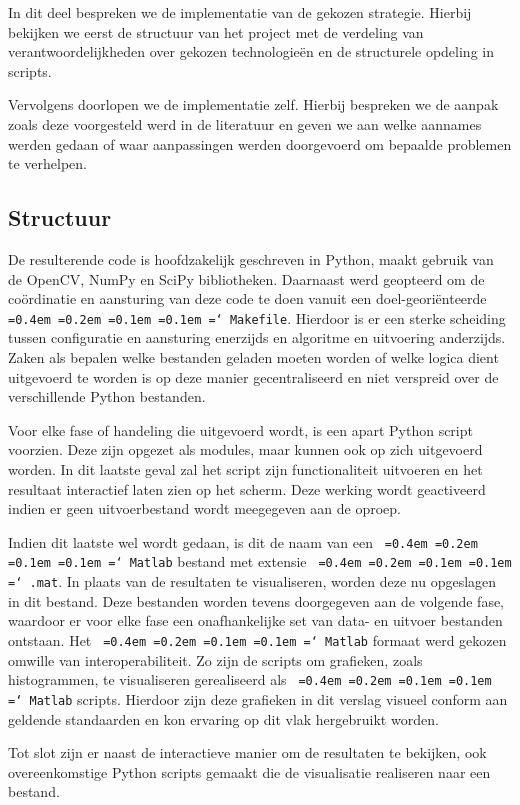 \documentclass[10pt,a4paper]{article}
\newcommand*\justify{%
  \fontdimen2\font=0.4em%
  \fontdimen3\font=0.2em%
  \fontdimen4\font=0.1em%
  \fontdimen7\font=0.1em%
  \hyphenchar\font=`\-%
}
\newcommand{\ttt}[1]{{\tt \justify{#1}}}
\begin{document}
In dit deel bespreken we de implementatie van de gekozen strategie. Hierbij bekijken we eerst de structuur van het project met de verdeling van verantwoordelijkheden over gekozen technologie\"en en de structurele opdeling in scripts.

Vervolgens doorlopen we de implementatie zelf. Hierbij bespreken we de aanpak zoals deze voorgesteld werd in de literatuur en geven we aan welke aannames werden gedaan of waar aanpassingen werden doorgevoerd om bepaalde problemen te verhelpen.

\subsection*{Structuur}

De resulterende code is hoofdzakelijk geschreven in Python, maakt gebruik van de OpenCV, NumPy en SciPy bibliotheken. Daarnaast werd geopteerd om de co\"ordinatie en aansturing van deze code te doen vanuit een doel-geori\"enteerde \ttt{Makefile}. Hierdoor is er een sterke scheiding tussen configuratie en aansturing enerzijds en algoritme en uitvoering anderzijds. Zaken als bepalen welke bestanden geladen moeten worden of welke logica dient uitgevoerd te worden is op deze manier gecentraliseerd en niet verspreid over de verschillende Python bestanden.

Voor elke fase of handeling die uitgevoerd wordt, is een apart Python script voorzien. Deze zijn opgezet als modules, maar kunnen ook op zich uitgevoerd worden. In dit laatste geval zal het script zijn functionaliteit uitvoeren en het resultaat interactief laten zien op het scherm. Deze werking wordt geactiveerd indien er geen uitvoerbestand wordt meegegeven aan de oproep.

Indien dit laatste wel wordt gedaan, is dit de naam van een \ttt{Matlab} bestand met extensie \ttt{.mat}. In plaats van de resultaten te visualiseren, worden deze nu opgeslagen in dit bestand. Deze bestanden worden tevens doorgegeven aan de volgende fase, waardoor er voor elke fase een onafhankelijke set van data- en uitvoer bestanden ontstaan. Het \ttt{Matlab} formaat werd gekozen omwille van interoperabiliteit. Zo zijn de scripts om grafieken, zoals histogrammen, te visualiseren gerealiseerd als \ttt{Matlab} scripts. Hierdoor zijn deze grafieken in dit verslag visueel conform aan geldende standaarden en kon ervaring op dit vlak hergebruikt worden.

Tot slot zijn er naast de interactieve manier om de resultaten te bekijken, ook overeenkomstige Python scripts gemaakt die de visualisatie realiseren naar een bestand.
\end{document}
